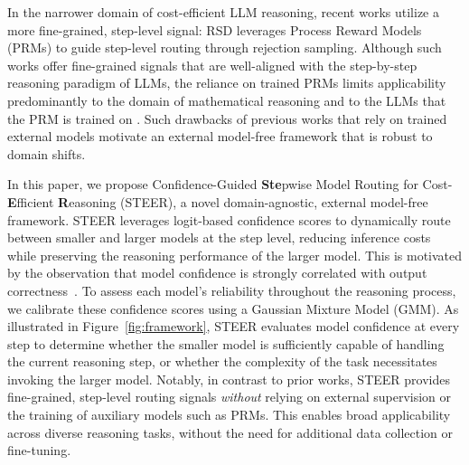 \documentclass[letterpaper]{article} %
\begin{document}
In the narrower domain of cost-efficient LLM reasoning, recent works utilize a more fine-grained, step-level signal: RSD \citep{liaoreward} leverages Process Reward Models (PRMs) to guide step-level routing through rejection sampling. Although such works offer fine-grained signals that are well-aligned with the step-by-step reasoning paradigm of LLMs, the reliance on trained PRMs limits applicability predominantly to the domain of mathematical reasoning \cite{zeng2025versaprm} and to the LLMs that the PRM is trained on \citep{zhu-etal-2025-retrieval}. Such drawbacks of previous works that rely on trained external models motivate an external model-free framework that is robust to domain shifts. %

In this paper, we propose Confidence-Guided \textbf{Ste}pwise Model Routing for Cost-\textbf{E}fficient \textbf{R}easoning (STEER), a novel domain-agnostic, external model-free framework. STEER leverages logit-based confidence scores to dynamically route between smaller and larger models at the step level, reducing inference costs while preserving the reasoning performance of the larger model. This is motivated by the observation that model confidence is strongly correlated with output correctness~\citep{wang2024chain, ma-etal-2025-cot, ma2025estimatingllmuncertaintyevidence}. To assess each model’s reliability throughout the reasoning process, we calibrate these confidence scores using a Gaussian Mixture Model (GMM). As illustrated in Figure~\ref{fig:framework}, STEER evaluates model confidence at every step to determine whether the smaller model is sufficiently capable of handling the current reasoning step, or whether the complexity of the task necessitates invoking the larger model. Notably, in contrast to prior works, STEER provides fine-grained, step-level routing signals \textit{without} relying on external supervision or the training of auxiliary models such as PRMs. This enables broad applicability across diverse reasoning tasks, without the need for additional data collection or fine-tuning. 
\end{document}
